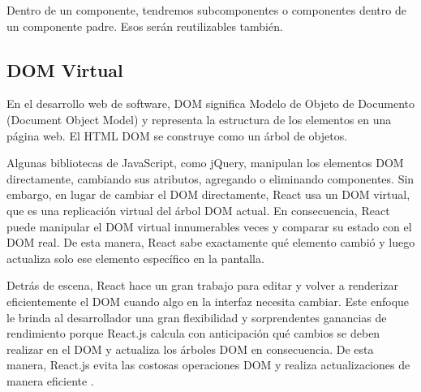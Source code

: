 Dentro de un componente, tendremos subcomponentes o componentes dentro de un componente padre. Esos serán reutilizables también.
\vspace{0.8cm}




\subsection{DOM Virtual}
En el desarrollo web de software, DOM significa Modelo de Objeto de Documento (Document Object Model) y representa la estructura de los elementos en una página web. El HTML DOM se construye como un árbol de objetos.

Algunas bibliotecas de JavaScript, como jQuery, manipulan los elementos DOM directamente, cambiando sus atributos, agregando o eliminando componentes. Sin embargo, en lugar de cambiar el DOM directamente, React usa un DOM virtual, que es una replicación virtual del árbol DOM actual. En consecuencia, React puede manipular el DOM virtual innumerables veces y comparar su estado con el DOM real. De esta manera, React sabe exactamente qué elemento cambió y luego actualiza solo ese elemento específico en la pantalla.

Detrás de escena, React hace un gran trabajo para editar y volver a renderizar eficientemente el DOM cuando algo en la interfaz necesita cambiar. Este enfoque le brinda al desarrollador una gran flexibilidad y sorprendentes ganancias de rendimiento porque React.js calcula con anticipación qué cambios se deben realizar en el DOM y actualiza los árboles DOM en consecuencia. De esta manera, React.js evita las costosas operaciones DOM y realiza actualizaciones de manera eficiente \cite{stefanov}.